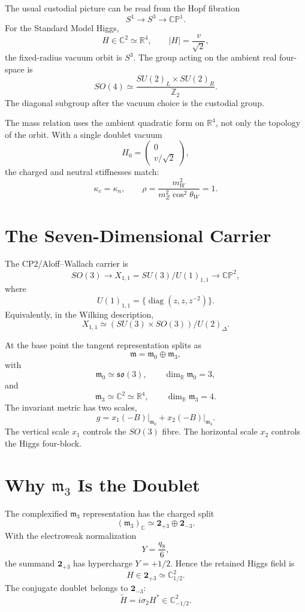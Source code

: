 \documentclass[11pt]{article}
\newcommand{\CP}{\mathbb{CP}}
\newcommand{\RR}{\mathbb{R}}
\newcommand{\CC}{\mathbb{C}}
\newcommand{\mzero}{\mathfrak m_0}
\newcommand{\mthree}{\mathfrak m_3}
\newcommand{\so}{\mathfrak{so}}
\begin{document}
The usual custodial picture can be read from the Hopf fibration
\[
S^1\longrightarrow S^3\longrightarrow \CP^1 .
\]
For the Standard Model Higgs,
\[
H\in \CC^2\simeq \RR^4,\qquad |H|=\frac{v}{\sqrt 2},
\]
the fixed-radius vacuum orbit is \(S^3\).  The group acting on the ambient
real four-space is
\[
SO(4)\simeq \frac{SU(2)_L\times SU(2)_R}{\mathbb Z_2}.
\]
The diagonal subgroup after the vacuum choice is the custodial group.

The mass relation uses the ambient quadratic form on \(\RR^4\), not only the
topology of the orbit.  With a single doublet vacuum
\[
H_0=\begin{pmatrix}0\\ v/\sqrt2\end{pmatrix},
\]
the charged and neutral stiffnesses match:
\[
\kappa_c=\kappa_n,\qquad
\rho=\frac{m_W^2}{m_Z^2\cos^2\theta_W}=1 .
\]

\section{The Seven-Dimensional Carrier}

The CP2/Aloff--Wallach carrier is
\[
SO(3)\longrightarrow X_{1,1}=SU(3)/U(1)_{1,1}\longrightarrow \CP^2,
\]
where
\[
U(1)_{1,1}=\{\operatorname{diag}(z,z,z^{-2})\}.
\]
Equivalently, in the Wilking description,
\[
X_{1,1}\simeq (SU(3)\times SO(3))/U(2)_\Delta .
\]

At the base point the tangent representation splits as
\[
\mathfrak m=\mzero\oplus\mthree,
\]
with
\[
\mzero\simeq\so(3),\qquad \dim_{\RR}\mzero=3,
\]
and
\[
\mthree\simeq\CC^2\simeq\RR^4,\qquad \dim_{\RR}\mthree=4 .
\]
The invariant metric has two scales,
\[
g=x_1(-B)\big|_{\mzero}+x_2(-B)\big|_{\mthree}.
\]
The vertical scale \(x_1\) controls the \(SO(3)\) fibre.  The horizontal
scale \(x_2\) controls the Higgs four-block.

\section{Why \texorpdfstring{$\mathfrak m_3$}{m3} Is the Doublet}

The complexified \(\mthree\) representation has the charged split
\[
(\mthree)_{\CC}\simeq \mathbf 2_{+3}\oplus \mathbf 2_{-3}.
\]
With the electroweak normalization
\[
Y=\frac{q_8}{6},
\]
the summand \(\mathbf 2_{+3}\) has hypercharge \(Y=+1/2\).  Hence the
retained Higgs field is
\[
H\in \mathbf 2_{+3}\simeq \CC^2_{1/2}.
\]
The conjugate doublet belongs to \(\mathbf 2_{-3}\):
\[
\widetilde H=i\sigma_2 H^*\in \CC^2_{-1/2}.
\]
\end{document}
